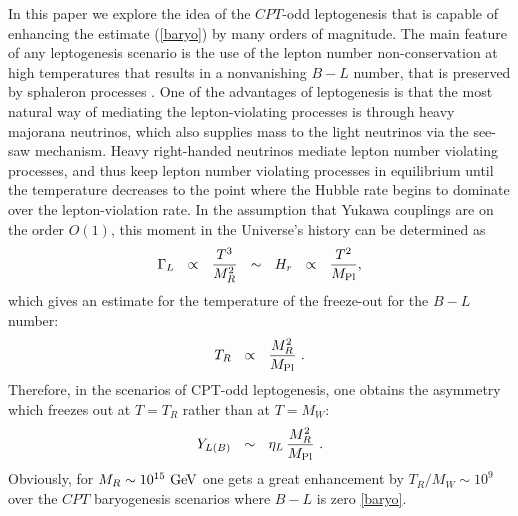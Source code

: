 \documentclass[12pt]{revtex4}
\newcommand{\Mpl}{M_{\rm Pl}}
\newcommand{\Tsph}{T_{\rm sph}}
\newcommand{\GeV}{{\rm GeV}}
\begin{document}

    In this paper we explore the idea of the $CPT$-odd leptogenesis that is capable of 
    enhancing the estimate (\ref{baryo}) by many orders of magnitude. 
    The main feature of any leptogenesis scenario is the use of the lepton number non-conservation 
    at high temperatures that results in a nonvanishing $ B - L $ 
    number, that is preserved by sphaleron processes \cite{Fukugita:1986hr}. 
	One of the advantages of leptogenesis is that the most natural way of mediating
the lepton-violating processes is through
	heavy majorana neutrinos, which also supplies mass to the light neutrinos
	via the see-saw mechanism. 
	Heavy right-handed neutrinos mediate lepton number violating processes, and thus keep
	lepton number violating processes in equilibrium 
until the temperature decreases to the point where the Hubble rate begins to dominate
over the lepton-violation rate.
	In the assumption that Yukawa couplings are on the order $O(1)$, this moment in the Universe's 
	history can be determined as 
\[
	\Gamma_L ~~\propto~~ \frac{T^3}{M_R^2} ~~\sim~~ H_r ~~\propto~~ \frac{T^2}{\Mpl},
\]
	which gives an estimate for the temperature of the freeze-out for the $B-L$ number:
\[
	T_R ~~\propto~~ \frac{M_R^2}{\Mpl}~.
\]
	Therefore, in the scenarios of CPT-odd leptogenesis, one obtains the asymmetry
	which freezes out at $ T = T_R $ rather than at $ T = M_W $:
\[
	Y_{L(B)} ~~\sim~~ \eta_L\, \frac{M_R^2}{\Mpl}~.
\]
	Obviously, for 	$ M_R \sim 10^{15}~\GeV $ one gets a great enhancement 
	by $ T_R/M_W \sim 10^{9}$ over the $CPT$ baryogenesis scenarios where 
$B-L$ is zero \eqref{baryo}.

\end{document}
